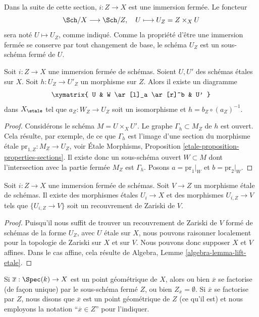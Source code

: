 \medskip\noindent
Dans la suite de cette section, $i : Z \to X$ est une immersion ferm\'ee.
Le foncteur
$$
\Sch/X \longrightarrow \Sch/Z, \quad
U \longmapsto U_Z = Z \times_X U
$$
sera not\'e $U \mapsto U_Z$, comme indiqu\'e. Comme la propri\'et\'e d'\^etre une immersion ferm\'ee
se conserve par tout changement de base, le sch\'ema $U_Z$ est un sous-sch\'ema ferm\'e
de $U$.

\begin{lemma}
\label{lemma-closed-immersion-almost-full}
Soit $i : Z \to X$ une immersion ferm\'ee de sch\'emas.
Soient $U, U'$ des sch\'emas \'etales sur $X$. Soit $h : U_Z \to U'_Z$
un morphisme sur $Z$. Alors il existe un diagramme
$$
\xymatrix{
U & W \ar[l]_a \ar[r]^b & U'
}
$$
dans $X_\etale$ tel que $a_Z : W_Z \to U_Z$
soit un isomorphisme et $h = b_Z \circ (a_Z)^{-1}$.
\end{lemma}

\begin{proof}
Consid\'erons le sch\'ema $M = U \times_X U'$. Le graphe $\Gamma_h \subset M_Z$
de $h$ est ouvert. Cela r\'esulte, par exemple, de ce que $\Gamma_h$ est l'image d'une
section du morphisme \'etale $\text{pr}_{1, Z} : M_Z \to U_Z$, voir
\'Etale Morphisms, Proposition \ref{etale-proposition-properties-sections}.
Il existe donc un sous-sch\'ema ouvert $W \subset M$ dont l'intersection avec
la partie ferm\'ee $M_Z$ est $\Gamma_h$. Posons $a = \text{pr}_1|_W$
et $b = \text{pr}_2|_W$.
\end{proof}

\begin{lemma}
\label{lemma-closed-immersion-almost-essentially-surjective}
Soit $i : Z \to X$ une immersion ferm\'ee de sch\'emas.
Soit $V \to Z$ un morphisme \'etale de sch\'emas.
Il existe des morphismes \'etales $U_i \to X$ et des morphismes
$U_{i, Z} \to V$ tels que $\{U_{i, Z} \to V\}$
soit un recouvrement de Zariski de $V$.
\end{lemma}

\begin{proof}
Puisqu'il nous suffit de trouver un recouvrement de Zariski de $V$ form\'e de sch\'emas
de la forme $U_Z$, avec $U$ \'etale sur $X$, nous pouvons raisonner localement pour la topologie de Zariski sur $X$
et sur $V$. Nous pouvons donc supposer $X$ et $V$ affines. Dans le cas affine, cela r\'esulte de
Algebra, Lemme \ref{algebra-lemma-lift-etale}.
\end{proof}

\noindent
Si $\overline{x} : \Spec(k) \to X$ est un point g\'eom\'etrique de $X$, alors
ou bien $\overline{x}$ se factorise (de fa\c{c}on unique) par le sous-sch\'ema ferm\'e $Z$, ou bien
$Z_{\overline{x}} = \emptyset$. Si $\overline{x}$ se factorise par $Z$,
nous disons que $\overline{x}$ est un point g\'eom\'etrique de $Z$ (ce qu'il est) et
nous employons la notation ``$\overline{x} \in Z$'' pour l'indiquer.

